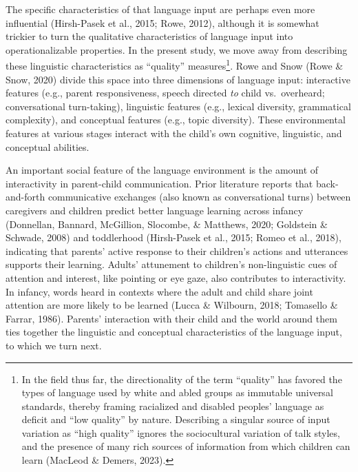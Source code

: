 \documentclass[
  man,floatsintext]{apa6}
\begin{document}
The specific characteristics of that language input are perhaps even more influential (Hirsh-Pasek et al., 2015; Rowe, 2012), although it is somewhat trickier to turn the qualitative characteristics of language input into operationalizable properties. In the present study, we move away from describing these linguistic characteristics as ``quality'' measures\footnote{In the field thus far, the directionality of the term ``quality'' has favored the types of language used by white and abled groups as immutable universal standards, thereby framing racialized and disabled peoples' language as deficit and ``low quality'' by nature. Describing a singular source of input variation as ``high quality'' ignores the sociocultural variation of talk styles, and the presence of many rich sources of information from which children can learn (MacLeod \& Demers, 2023).}. Rowe and Snow (Rowe \& Snow, 2020) divide this space into three dimensions of language input: interactive features (e.g., parent responsiveness, speech directed \emph{to} child vs.~overheard; conversational turn-taking), linguistic features (e.g., lexical diversity, grammatical complexity), and conceptual features (e.g., topic diversity). These environmental features at various stages interact with the child's own cognitive, linguistic, and conceptual abilities.

An important social feature of the language environment is the amount of interactivity in parent-child communication. Prior literature reports that back-and-forth communicative exchanges (also known as conversational turns) between caregivers and children predict better language learning across infancy (Donnellan, Bannard, McGillion, Slocombe, \& Matthews, 2020; Goldstein \& Schwade, 2008) and toddlerhood (Hirsh-Pasek et al., 2015; Romeo et al., 2018), indicating that parents' active response to their children's actions and utterances supports their learning. Adults' attunement to children's non-linguistic cues of attention and interest, like pointing or eye gaze, also contributes to interactivity. In infancy, words heard in contexts where the adult and child share joint attention are more likely to be learned (Lucca \& Wilbourn, 2018; Tomasello \& Farrar, 1986). Parents' interaction with their child and the world around them ties together the linguistic and conceptual characteristics of the language input, to which we turn next.
\end{document}
